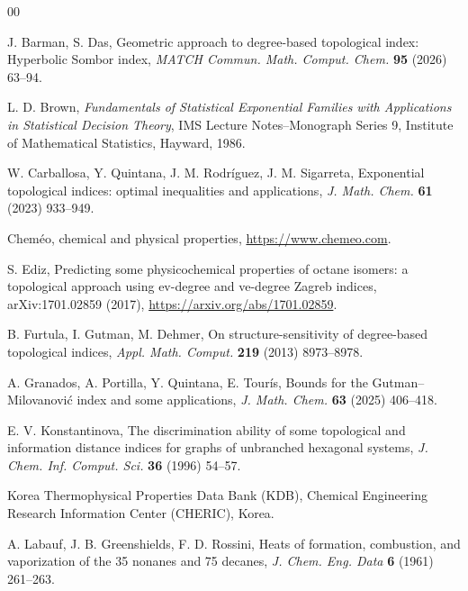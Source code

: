 \documentclass[a5paper, 10pt]{article}
\theoremstyle{plain}
\theoremstyle{remark}
\theoremstyle{definition}
\begin{document}
\FloatBarrier
\singlespacing
\begin{thebibliography}{00}

   J. Barman, S. Das, Geometric approach to
  degree-based topological index: Hyperbolic Sombor index, \textit{MATCH
  Commun. Math. Comput. Chem.\/} \textbf{95} (2026) 63--94.

   L. D. Brown, \textit{Fundamentals of Statistical
  Exponential Families with Applications in Statistical Decision
  Theory\/}, IMS Lecture Notes--Monograph Series 9, Institute of
  Mathematical Statistics, Hayward, 1986.

   W. Carballosa, Y. Quintana,
  J. M. Rodr\'iguez, J. M. Sigarreta, Exponential topological indices: optimal
  inequalities and applications, \textit{J. Math. Chem.\/} \textbf{61} (2023) 933--949.

   Chem\'eo, chemical and physical properties,
  \url{https://www.chemeo.com}.

  S. Ediz, Predicting some physicochemical properties of octane isomers:
  a topological approach using ev-degree and ve-degree Zagreb indices,
  arXiv:1701.02859 (2017), \url{https://arxiv.org/abs/1701.02859}.

   B. Furtula, I. Gutman, M. Dehmer, On
  structure-sensitivity of degree-based topological indices, \textit{Appl.
  Math. Comput.\/} \textbf{219} (2013) 8973--8978.

   A. Granados, A. Portilla, Y. Quintana,
  E. Tour\'is, Bounds for the Gutman--Milovanovi\'c index and some
  applications, \textit{J. Math. Chem.\/} \textbf{63} (2025)
  406--418.

   E. V. Konstantinova, The
  discrimination ability of some topological and information distance indices
  for graphs of unbranched hexagonal systems, \textit{J. Chem. Inf. Comput.
  Sci.\/} \textbf{36} (1996) 54--57.

   Korea Thermophysical Properties Data Bank (KDB), Chemical
  Engineering Research Information Center (CHERIC), Korea.

   A. Labauf, J. B. Greenshields,
  F. D. Rossini, Heats of formation, combustion, and vaporization of the
  35 nonanes and 75 decanes, \textit{J. Chem. Eng. Data\/} \textbf{6}
  (1961) 261--263.


\end{thebibliography}
\end{document}
